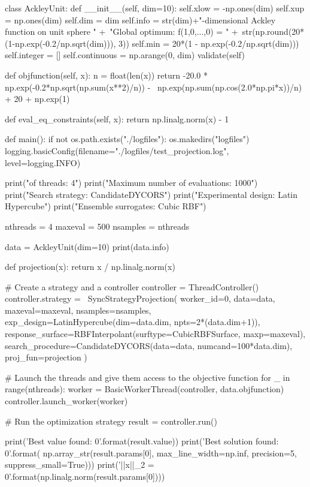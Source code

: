 \documentclass[]{article}
\begin{document}
\begin{python}

class AckleyUnit:
    def __init__(self, dim=10):
        self.xlow = -np.ones(dim)
        self.xup = np.ones(dim)
        self.dim = dim
        self.info = str(dim)+"-dimensional Ackley function on unit sphere \n" +\
                             "Global optimum: f(1,0,...,0) = " +\
                             str(np.round(20*(1-np.exp(-0.2/np.sqrt(dim))), 3))
        self.min = 20*(1 - np.exp(-0.2/np.sqrt(dim)))
        self.integer = []
        self.continuous = np.arange(0, dim)
        validate(self)

    def objfunction(self, x):
        n = float(len(x))
        return -20.0 * np.exp(-0.2*np.sqrt(np.sum(x**2)/n)) - \
            np.exp(np.sum(np.cos(2.0*np.pi*x))/n) + 20 + np.exp(1)

    def eval_eq_constraints(self, x):
        return np.linalg.norm(x) - 1


def main():
    if not os.path.exists("./logfiles"):
        os.makedirs("logfiles")
    logging.basicConfig(filename="./logfiles/test_projection.log",
                        level=logging.INFO)

    print("\nNumber of threads: 4")
    print("Maximum number of evaluations: 1000")
    print("Search strategy: CandidateDYCORS")
    print("Experimental design: Latin Hypercube")
    print("Ensemble surrogates: Cubic RBF")

    nthreads = 4
    maxeval = 500
    nsamples = nthreads

    data = AckleyUnit(dim=10)
    print(data.info)

    def projection(x):
        return x / np.linalg.norm(x)

    # Create a strategy and a controller
    controller = ThreadController()
    controller.strategy = \
        SyncStrategyProjection(
            worker_id=0, data=data,
            maxeval=maxeval, nsamples=nsamples,
            exp_design=LatinHypercube(dim=data.dim, npts=2*(data.dim+1)),
            response_surface=RBFInterpolant(surftype=CubicRBFSurface, 
                                            maxp=maxeval),
            search_procedure=CandidateDYCORS(data=data, numcand=100*data.dim),
            proj_fun=projection
        )

    # Launch the threads and give them access to the objective function
    for _ in range(nthreads):
        worker = BasicWorkerThread(controller, data.objfunction)
        controller.launch_worker(worker)

    # Run the optimization strategy
    result = controller.run()

    print('Best value found: {0}'.format(result.value))
    print('Best solution found: {0}'.format(
        np.array_str(result.params[0], max_line_width=np.inf,
                     precision=5, suppress_small=True)))
    print('||x||_2 = {0}\n'.format(np.linalg.norm(result.params[0])))
\end{python}
\end{document}
